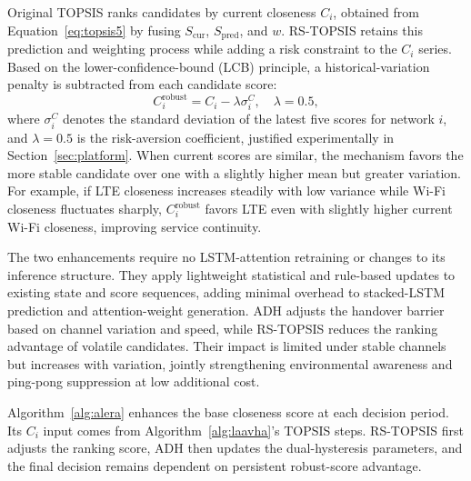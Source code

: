 \documentclass[final,3p,times,twocolumn]{elsarticle}
\begin{document}
Original TOPSIS ranks candidates by current closeness $C_i$, obtained from Equation~\eqref{eq:topsis5} by fusing $S_{\mathrm{cur}}$, $S_{\mathrm{pred}}$, and $w$. RS-TOPSIS retains this prediction and weighting process while adding a risk constraint to the $C_i$ series. Based on the lower-confidence-bound (LCB) principle, a historical-variation penalty is subtracted from each candidate score:
\begin{equation}
C_i^{\mathrm{robust}}=C_i-\lambda\sigma_i^C,\quad \lambda=0.5,
\label{eq:rstopsis}
\end{equation}
where $\sigma_i^C$ denotes the standard deviation of the latest five scores for network $i$, and $\lambda=0.5$ is the risk-aversion coefficient, justified experimentally in Section~\ref{sec:platform}. When current scores are similar, the mechanism favors the more stable candidate over one with a slightly higher mean but greater variation. For example, if LTE closeness increases steadily with low variance while Wi-Fi closeness fluctuates sharply, $C_i^{\mathrm{robust}}$ favors LTE even with slightly higher current Wi-Fi closeness, improving service continuity.

The two enhancements require no LSTM-attention retraining or changes to its inference structure. They apply lightweight statistical and rule-based updates to existing state and score sequences, adding minimal overhead to stacked-LSTM prediction and attention-weight generation. ADH adjusts the handover barrier based on channel variation and speed, while RS-TOPSIS reduces the ranking advantage of volatile candidates. Their impact is limited under stable channels but increases with variation, jointly strengthening environmental awareness and ping-pong suppression at low additional cost.

Algorithm~\ref{alg:alera} enhances the base closeness score at each decision period. Its $C_i$ input comes from Algorithm~\ref{alg:laavha}'s TOPSIS steps. RS-TOPSIS first adjusts the ranking score, ADH then updates the dual-hysteresis parameters, and the final decision remains dependent on persistent robust-score advantage.
\end{document}
